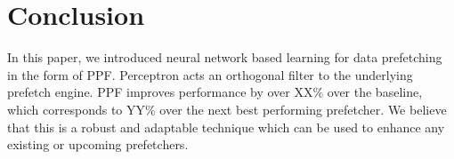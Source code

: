 \section{Conclusion}
\label{Conclusion}
In this paper, we introduced neural network based learning for data
prefetching in the form of PPF.  Perceptron acts an orthogonal
filter to the underlying prefetch engine.  PPF improves
performance by over XX\% over the baseline, which corresponds to YY\%
over the next best performing prefetcher.  
We believe that this is a robust and adaptable technique which can
be used to enhance any existing or upcoming prefetchers.
